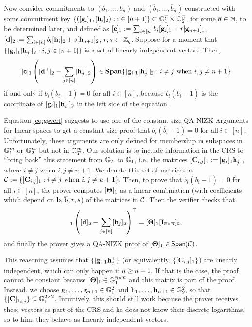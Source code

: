 Now consider commitments to $(b_1,\ldots,b_n)$ and $(\overline{b}_1,\ldots,\overline{b}_n)$ constructed with some commitment key $\{([\mathbf{g}_i]_1,[\mathbf{h}_i]_2): i \in [n+1]\}\subset\mathbb{G}_1^{{\overline{n}}}\times\mathbb{G}_2^{\overline{n}}$, for some ${\overline{n}}\in\mathbb{N}$, to be determined later, and defined as $[\mathbf{c}]_1:=\sum_{i \in [n]} b_i [\mathbf{g}_i]_1 + r [\mathbf{g}_{n+1}]_1$, 
$[\mathbf{d}]_2:=\sum_{i \in [n]} \overline{b}_i [\mathbf{h}_i]_2 + s [{\mathbf{h}}_{n+1}]_2$, $r,s \gets \mathbb{Z}_q$. Suppose for a moment that 
$\{ [\mathbf{g}_{i}]_1 [\mathbf{h}_{j}^\top]_2 : i,j \in [n+1]\}$ 
is a set of linearly independent vectors. Then,  
\begin{equation} \label{eq:gsveri}
[\mathbf{c}]_1 \left([\mathbf{d}^\top]_2-
\sum_{j\in[n]} [\mathbf{h}_j^\top]_2\right) \in \mathbf{Span}\{ [\mathbf{g}_i]_1[\mathbf{h}_j^\top]_2: i\neq j\text{ when } i,j\neq n+1 \} 
\end{equation}
if and only if $b_i(\overline{b}_i-1)=0$ for all $i \in [n]$,
because $b_i(\overline{b}_i-1)$ is the coordinate of 
$[\mathbf{g}_i]_1[\mathbf{h}_i^\top]_2$ in the left side of the equation.


Equation \ref{eq:gsveri} suggests to use one of the constant-size QA-NIZK Arguments for linear spaces to get a constant-size proof that $b_i(\overline{b}_i-1)=0$ for all $i \in [n]$. Unfortunately, these arguments are only defined for membership in subspaces  in 
$\mathbb{G}_1^m$ or $\mathbb{G}_2^m$ but not in $\mathbb{G}_T^m$. Our solution is to include information in the CRS to ``bring back'' 
  this statement from $\mathbb{G}_T$ to $\mathbb{G}_1$, i.e.\ 
  the matrices   $[\mathbf{{C}}_{i,j}]_1:=[\mathbf{g}_i]_1\mathbf{h}_j^{\top}$, where $i\neq j$ when $i,j\neq n+1$. We denote this set of matrices as
 $\mathcal{C}:=\{[\mathbf{{C}}_{i,j}]_1: i\neq j\text{ when } i,j\neq n+1\}$.   
Then, to prove that $b_i(\overline{b}_i-1)=0$ for all $i\in [n]$, the prover computes 
$[\mathbf{{\Theta}}]_1$ as a linear combination (with coefficients which depend on
 $\mathbf{b},\mathbf{\overline{b}},r,s$) of the matrices in $\mathcal{C}$.
Then the verifier checks that
\begin{equation}
[\vecb{c}]_1\left([\vecb{d}]_2-
\sum_{j\in[n]}[\lrck_j]_2\right)^{\top}=
[\matr{\Theta}]_1[\matr{I}_{\nb\times\nb}]_2,
\end{equation}
 and finally the prover gives a QA-NIZK proof of  $[\mathbf{{\Theta}}]_1 \in \mathsf{Span}(\mathcal{C})$.

This reasoning assumes that $\{[\mathbf{g}_i]_1 \mathbf{h}_j^{\top}\}$ (or equivalently, $\{[\mathbf{{C}}_{i,j}]_1\}$) are linearly independent,  which can only happen if 
${\overline{n}} \geq n+1$. If that is the case, the proof cannot be constant because $[\mathbf{{\Theta}}]_1 \in \mathbb{G}_1^{{\overline{n}}\times{\overline{n}}}$ and this matrix is part of the proof.
Instead, we choose $\mathbf{g}_1,\ldots,\mathbf{g}_{n+1} \in \mathbb{G}_1^{2}$ and $\mathbf{h}_1,\ldots,\mathbf{h}_{n+1} \in \mathbb{G}_2^{2}$, so that 
$\{{[\mathbf{{C}}]_1}_{i,j}\} \subseteq \mathbb{G}_1^{2 \times 2}$.  Intuitively, this should still work because the prover receives these vectors as part of the CRS and he does not know their discrete logarithms, so to him, they behave as linearly independent vectors.  

